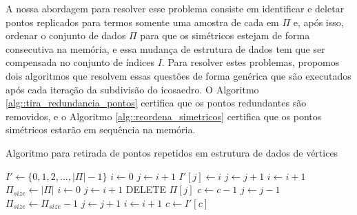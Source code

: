 \documentclass[
    12pt,                %
    oneside,            %
    a4paper,            %
    english,            %
    french,                %
    spanish,            %
    brazil                %
    ]{abntex2}
\begin{document}
A nossa abordagem para resolver esse problema consiste em identificar e deletar pontos replicados para termos somente uma amostra de cada em $\Pi$ e, após isso, ordenar o conjunto de dados $\Pi$ para que os simétricos estejam de forma consecutiva na memória, e essa mudança de estrutura de dados tem que ser compensada no conjunto de índices $I$. Para resolver estes problemas, propomos dois algoritmos que resolvem essas questões de forma genérica que são executados após cada iteração da subdivisão do icosaedro. O Algoritmo \ref{alg::tira_redundancia_pontos} certifica que os pontos redundantes são removidos, e o Algoritmo \ref{alg::reordena_simetricos} certifica que os pontos simétricos estarão em sequência na memória.

\begin{algorithm}
\caption{Algoritmo para retirada de pontos repetidos em estrutura de dados de vértices}
\label{alg::tira_redundancia_pontos}
\begin{algorithmic}[1]
 \State $I' \gets \{0, 1, 2, ..., |\Pi| - 1\}$
\State $i \gets 0$
 \label{alg::svs_pt1_inicio}
    \State $j \gets i + 1$
        \If {$\Pi[i] = \Pi[j]$}
            \State $I'[j] \gets i$
        \EndIf
        \State $j \gets j + 1$
    \EndWhile
    \State $i \gets i + 1$
\EndWhile \label{alg::svs_pt1_fim}
\State $\Pi_{size} \gets |\Pi|$
\State $i \gets 0$
 \label{alg::svs_pt2_inicio}
    \State $j \gets i + 1$
        \If{$\Pi[i] = \Pi[j]$}
            \State DELETE $\Pi[j]$ \label{alg::delete}
                \State $c \gets c - 1$
            \EndFor
            \State $j \gets j - 1$
            \State $\Pi_{size} \gets \Pi_{size} - 1$
        \EndIf
        \State $j \gets j + 1$
    \EndWhile
    \State $i \gets i + 1$
\EndWhile \label{alg::svs_pt2_fim}
 \label{alg::resetI}
    \State $c \gets I'[c]$
\EndFor
\EndProcedure
\end{algorithmic}
\end{algorithm}
\end{document}
